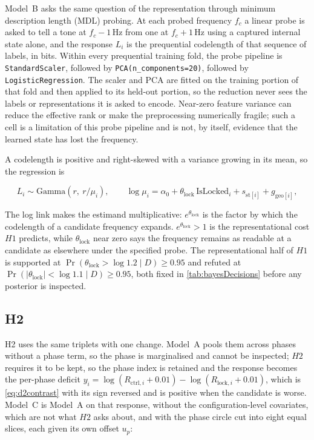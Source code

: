 Model~B asks the same question of the representation through minimum description length (MDL) probing\autocite{voitaInformationTheoreticProbingMinimum2020}. At each probed frequency $f_c$ a linear probe is asked to tell a tone at $f_c-1$\,Hz from one at $f_c+1$\,Hz using a captured internal state alone, and the response $L_i$ is the prequential codelength of that sequence of labels, in bits. Within every prequential training fold, the probe pipeline is \texttt{StandardScaler}, followed by \texttt{PCA(n\_components=20)}, followed by \texttt{LogisticRegression}. The scaler and PCA are fitted on the training portion of that fold and then applied to its held-out portion, so the reduction never sees the labels or representations it is asked to encode. Near-zero feature variance can reduce the effective rank or make the preprocessing numerically fragile; such a cell is a limitation of this probe pipeline and is not, by itself, evidence that the learned state has lost the frequency.

A codelength is positive and right-skewed with a variance growing in its mean, so the regression is

\begin{equation}
\label{eq:d2mdl}
L_i \sim \text{Gamma}\!\left(r,\ r/\mu_i\right),
\qquad
\log \mu_i = \alpha_0 + \theta_{\mathrm{lock}}\,\mathrm{IsLocked}_i + s_{\text{st}[i]} + g_{\text{geo}[i]},
\end{equation}

The log link makes the estimand multiplicative: $e^{\theta_{\mathrm{lock}}}$ is the factor by which the codelength of a candidate frequency expands. $e^{\theta_{\mathrm{lock}}}>1$ is the representational cost $H1$ predicts, while $\theta_{\mathrm{lock}}$ near zero says the frequency remains as readable at a candidate as elsewhere under the specified probe. The representational half of $H1$ is supported at $\Pr(\theta_{\mathrm{lock}} > \log 1.2 \mid D)\ge 0.95$ and refuted at $\Pr(|\theta_{\mathrm{lock}}| < \log 1.1 \mid D)\ge 0.95$, both fixed in \autoref{tab:bayesDecisions} before any posterior is inspected.

\subsection{H2}

H2 uses the same triplets with one change. Model~A pools them across phases without a phase term, so the phase is marginalised and cannot be inspected; $H2$ requires it to be kept, so the phase index is retained and the response becomes the per-phase deficit $y_i = \log(R_{\text{ctrl},i}+0.01)-\log(R_{\text{lock},i}+0.01)$, which is \autoref{eq:d2contrast} with its sign reversed and is positive when the candidate is worse. Model~C is Model~A on that response, without the configuration-level covariates, which are not what $H2$ asks about, and with the phase circle cut into eight equal slices, each given its own offset $u_p$:

